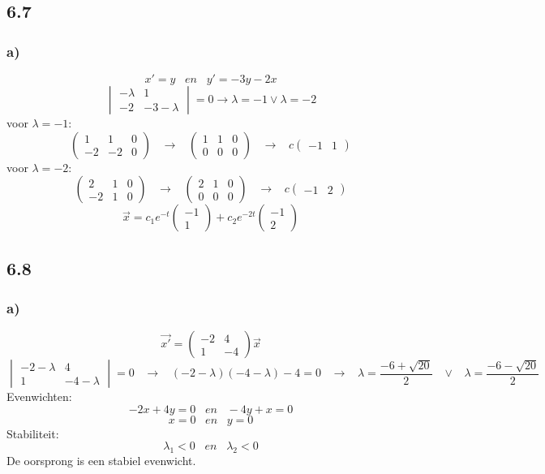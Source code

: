 \documentclass[11pt]{article}
\begin{document}
\subsection*{6.7}
\subsubsection*{a)}
\[
x'=y 
\;\;\;en\;\;\;
y'=-3y-2x
\]
\[
\begin{vmatrix}
-\lambda & 1\\
-2 & -3-\lambda
\end{vmatrix}
=0
\longrightarrow
\lambda = -1 \vee \lambda = -2
\]
voor $\lambda=-1$:
\[
\left(
\begin{array}{cc|c}
1 & 1 & 0\\
-2 & -2 & 0
\end{array}
\right)
\;\;\;\longrightarrow\;\;\;
\left(
\begin{array}{cc|c}
1 & 1 & 0\\
0 & 0 & 0
\end{array}
\right)
\;\;\;\longrightarrow\;\;\;
c
\begin{pmatrix}
-1 & 1
\end{pmatrix}
\]
voor $\lambda=-2$:
\[
\left(
\begin{array}{cc|c}
2 & 1 & 0\\
-2 & 1 & 0
\end{array}
\right)
\;\;\;\longrightarrow\;\;\;
\left(
\begin{array}{cc|c}
2 & 1 & 0\\
0 & 0 & 0
\end{array}
\right)
\;\;\;\longrightarrow\;\;\;
c
\begin{pmatrix}
-1 & 2
\end{pmatrix}
\]
\[
\vec{x}=
c_1e^{-t}
\begin{pmatrix}
-1\\1
\end{pmatrix}
+ c_2e^{-2t}
\begin{pmatrix}
-1\\2
\end{pmatrix}
\]

\subsection*{6.8}
\subsubsection*{a)}
\[
\vec{x'} = 
\begin{pmatrix}
-2 & 4\\
1 & -4
\end{pmatrix}
\vec{x}
\]
\[
\begin{vmatrix}
-2-\lambda & 4 \\
1 & -4-\lambda
\end{vmatrix}
=0
\;\;\;\longrightarrow\;\;\;
(-2-\lambda)(-4-\lambda)-4=0
\;\;\;\longrightarrow\;\;\;
\lambda = \frac{-6+\sqrt{20}}{2} \;\;\;\vee\;\;\;\lambda = \frac{-6-\sqrt{20}}{2}
\]
Evenwichten:
\[
-2x+4y=0 \;\;\;en\;\;\; -4y+x=0
\]
\[
x=0 \;\;\;en\;\;\; y=0
\]
Stabiliteit:
\[
\lambda_1 < 0 \;\;\;en\;\;\; \lambda_2 < 0
\]
De oorsprong is een stabiel evenwicht.
\end{document}
